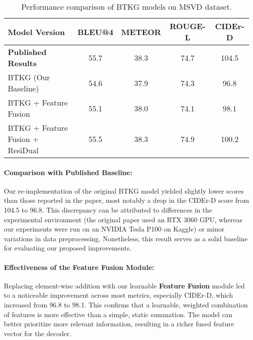 \begin{table}[H]
  \centering
  \renewcommand{\arraystretch}{1.5}
  \normalsize
  \label{tab:model_comparison}
  \begin{tabular}{lcccc}
    \hline
    \textbf{Model Version} & \textbf{BLEU@4} &
    \textbf{METEOR} & \textbf{ROUGE-L} & \textbf{CIDEr-D} \\
    \hline
    \textbf{Published Results} & 55.7 & 38.3 & 74.7 & 104.5   \\
    \hline
    BTKG (Our Baseline) & 54.6 & 37.9 & 74.3 & 96.8    \\
    BTKG + Feature Fusion & 55.1 & 38.0 & 74.1 & 98.1    \\
    BTKG + Feature Fusion + ResiDual & 55.5   & 38.3   & 74.9    & 100.2   \\
    \hline
  \end{tabular}
  \caption{Performance comparison of BTKG models on MSVD dataset.}
\end{table}

\paragraph{Comparison with Published Baseline:} Our re-implementation of the original BTKG model yielded slightly lower scores than those reported in the paper, most notably a drop in the CIDEr-D score from 104.5 to 96.8. This discrepancy can be attributed to differences in the experimental environment (the original paper used an RTX 3060 GPU, whereas our experiments were run on an NVIDIA Tesla P100 on Kaggle) or minor variations in data preprocessing. Nonetheless, this result serves as a solid baseline for evaluating our proposed improvements.

\paragraph{Effectiveness of the Feature Fusion Module:} Replacing element-wise addition with our learnable \textbf{Feature Fusion} module led to a noticeable improvement across most metrics, especially CIDEr-D, which increased from 96.8 to 98.1. This confirms that a learnable, weighted combination of features is more effective than a simple, static summation. The model can better prioritize more relevant information, resulting in a richer fused feature vector for the decoder.

